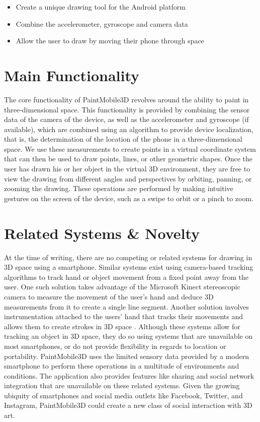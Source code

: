 \documentclass{chi-ext}
\begin{document}
\begin{itemize} \item Create a unique drawing tool for the Android platform
\item Combine the accelerometer, gyroscope and camera data \item Allow the
user to draw by moving their phone through space \end{itemize}

\section{Main Functionality}

The core functionality of PaintMobile3D revolves around the ability to paint
in three-dimensional space. This functionality is provided by combining the
sensor data of the camera of the device, as well as the accelerometer and
gyroscope (if available), which are combined using an algorithm to provide
device localization, that is, the determination of the location of the phone
in a three-dimensional space. We use these measurements to create points in a
virtual coordinate system that can then be used to draw points, lines, or
other geometric shapes. Once the user has drawn his or her object in the
virtual 3D environment, they are free to view the drawing from different
angles and perspectives by orbiting, panning, or zooming the drawing. These
operations are performed by making intuitive gestures on the screen of the
device, such as a swipe to orbit or a pinch to zoom.

\section{Related Systems \& Novelty}

At the time of writing, there are no competing or related systems for drawing
in 3D space using a smartphone. Similar systems exist using camera-based
tracking algorithms to track hand or object movement from a fixed point away
from the user. One such solution takes advantage of the Microsoft Kinect
stereoscopic camera to measure the movement of the user’s hand and deduce 3D
measurements from it to create a single line segment. Another solution
involves instrumentation attached to the users' hand that tracks their
movements and allows them to create strokes in 3D space
\cite{schkolne2002drawing}. Although these systems allow for tracking an
object in 3D space, they do so using systems that are unavailable on most
smartphones, or do not provide flexibility in regards to location or
portability. PaintMobile3D uses the limited sensory data provided by a modern
smartphone to perform these operations in a multitude of environments and
conditions. The application also provides features like sharing and social
network integration that are unavailable on these related systems. Given the
growing ubiquity of smartphones and social media outlets like Facebook,
Twitter, and Instagram, PaintMobile3D could create a new class of social
interaction with 3D art.
\end{document}

